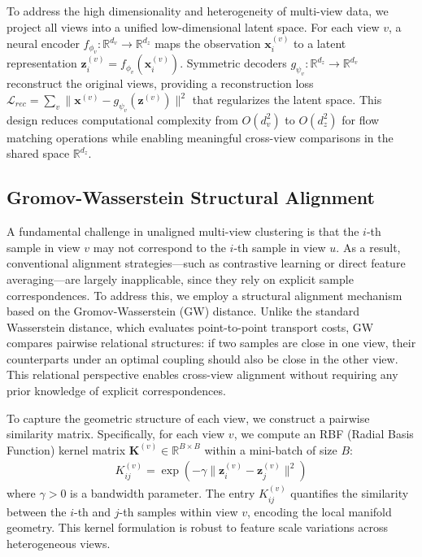 \documentclass{article}
\theoremstyle{plain}
\theoremstyle{definition}
\theoremstyle{remark}
\begin{document}
To address the high dimensionality and heterogeneity of multi-view data, we project all views into a unified low-dimensional latent space. For each view $v$, a neural encoder $f_{\phi_v}: \mathbb{R}^{d_v} \to \mathbb{R}^{d_z}$ maps the observation $\mathbf{x}_i^{(v)}$ to a latent representation $\mathbf{z}_i^{(v)} = f_{\phi_v}(\mathbf{x}_i^{(v)})$. Symmetric decoders $g_{\psi_v}: \mathbb{R}^{d_z} \to \mathbb{R}^{d_v}$ reconstruct the original views, providing a reconstruction loss $\mathcal{L}_{rec} = \sum_v \|\mathbf{x}^{(v)} - g_{\psi_v}(\mathbf{z}^{(v)})\|^2$ that regularizes the latent space. This design reduces computational complexity from $O(d_v^2)$ to $O(d_z^2)$ for flow matching operations while enabling meaningful cross-view comparisons in the shared space $\mathbb{R}^{d_z}$.

\subsection{Gromov-Wasserstein Structural Alignment}\label{gw-vector-field}
A fundamental challenge in unaligned multi-view clustering is that the $i$-th sample in view $v$ may not correspond to the $i$-th sample in view $u$. As a result, conventional alignment strategies—such as contrastive learning or direct feature averaging—are largely inapplicable, since they rely on explicit sample correspondences. To address this, we employ a structural alignment mechanism based on the Gromov-Wasserstein (GW) distance. Unlike the standard Wasserstein distance, which evaluates point-to-point transport costs, GW compares pairwise relational structures: if two samples are close in one view, their counterparts under an optimal coupling should also be close in the other view. This relational perspective enables cross-view alignment without requiring any prior knowledge of explicit correspondences.

To capture the geometric structure of each view, we construct a pairwise similarity matrix. Specifically, for each view $v$, we compute an RBF (Radial Basis Function) kernel matrix $\mathbf{K}^{(v)} \in \mathbb{R}^{B \times B}$ within a mini-batch of size $B$:
\begin{align}
K_{ij}^{(v)} = \exp\left(-\gamma \| \mathbf{z}_i^{(v)} - \mathbf{z}_j^{(v)} \|^2\right)
\end{align}
where $\gamma > 0$ is a bandwidth parameter. The entry $K_{ij}^{(v)}$ quantifies the similarity between the $i$-th and $j$-th samples within view $v$, encoding the local manifold geometry. This kernel formulation is robust to feature scale variations across heterogeneous views.
\end{document}
